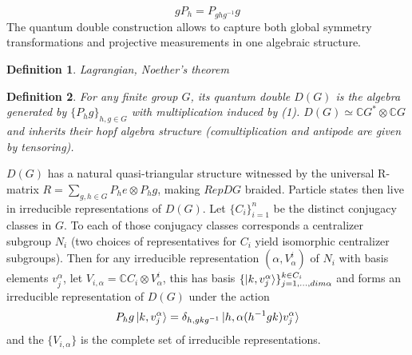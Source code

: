\documentclass{article}
\newtheorem{definition}{Definition}
\begin{document}
\begin{equation}
gP_h = P_{ghg^{-1}}g
\end{equation}
The quantum double construction allows to capture both global symmetry transformations and projective measurements in one algebraic structure.
\begin{definition}
	Lagrangian, Noether's theorem
\end{definition}
\begin{definition}
	For any finite group $G$, its quantum double $D(G)$ is the algebra generated by $\{P_hg\}_{h,g\in G}$ with multiplication induced by (1). $D(G) \simeq \mathbb{C}G^* \otimes \mathbb{C}G$ and inherits their hopf algebra structure (comultiplication and antipode are given by tensoring). 
\end{definition}
$D(G)$ has a natural quasi-triangular structure witnessed by the universal R-matrix $R=\sum_{g,h \in G}P_he \otimes P_hg$, making $RepDG$ braided. Particle states then live in irreducible representations of $D(G)$. Let $\{C_i\}_{i=1}^n$ be the distinct conjugacy classes in $G$. To each of those conjugacy classes corresponds a centralizer subgroup $N_i$ (two choices of representatives for $C_i$ yield isomorphic centralizer subgroups). Then for any irreducible representation $(\alpha,V^i_\alpha)$ of $N_i$ with basis elements $v^\alpha_j$, let $V_{i,\alpha} = \mathbb{C}C_i \otimes V^i_\alpha$, this has basis $\{ \ket{k,v^\alpha_j} \}_{j=1,...,dim\alpha}^{k\in C_i}$ and forms an irreducible representation of $D(G)$ under the action 
\begin{equation}
P_hg\ket{k,v^\alpha_j} = \delta_{h,gkg^{-1}} \ket{h,\alpha(h^{-1}gk)v^\alpha_j}
\end{equation}
and the $\{V_{i,\alpha}\}$ is the complete set of irreducible representations.

\end{document}

